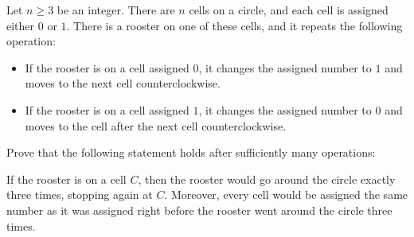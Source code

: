 \begin{problem}[APMO 2025]
    Let $n \geq 3$ be an integer. There are $n$ cells on a circle, and each cell is assigned either $0$ or $1$. There is a rooster on one of these cells, and it repeats the following operation:
    \begin{itemize}
        \item If the rooster is on a cell assigned $0$, it changes the assigned number to $1$ and moves to the next cell counterclockwise.
        \item If the rooster is on a cell assigned $1$, it changes the assigned number to $0$ and moves to the cell after the next cell counterclockwise.
    \end{itemize}
    Prove that the following statement holds after sufficiently many operations:

    If the rooster is on a cell $C$, then the rooster would go around the circle exactly three times, stopping again at $C$. Moreover, every cell would be assigned the same number as it was assigned right before the rooster went around the circle three times.
\end{problem}

